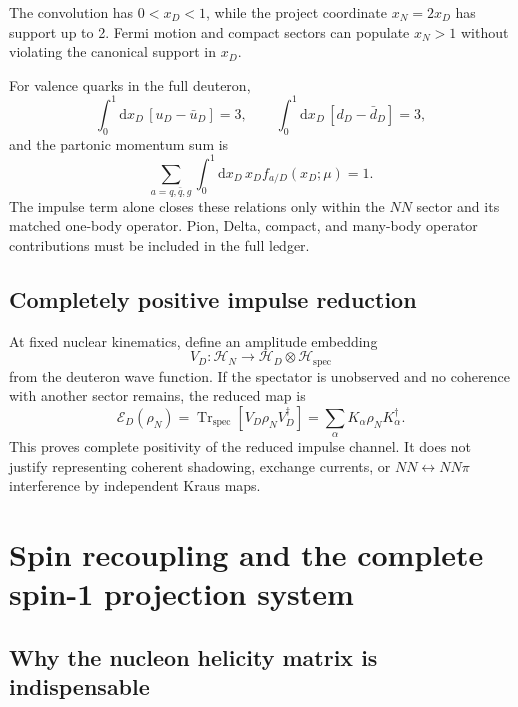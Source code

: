 \documentclass[11pt]{article}
\newcommand{\dd}{\mathrm{d}}
\newcommand{\Tr}{\operatorname{Tr}}
\newcommand{\Hil}{\mathcal H}
\newcommand{\cE}{\mathcal E}
\newcommand{\spec}{\mathrm{spec}}
\begin{document}
The convolution has \(0<x_D<1\), while the project coordinate
\(x_N=2x_D\) has support up to 2.  Fermi motion and compact sectors can
populate \(x_N>1\) without violating the canonical support in \(x_D\).

For valence quarks in the full deuteron,
\begin{equation}
 \int_0^1\dd x_D\,[u_D-\bar u_D]=3,
 \qquad
 \int_0^1\dd x_D\,[d_D-\bar d_D]=3,
\label{eq:deuteron-valence-ledger}
\end{equation}
and the partonic momentum sum is
\begin{equation}
 \sum_{a=q,\bar q,g}
 \int_0^1\dd x_D\,x_D f_{a/D}(x_D;\mu)=1.
\label{eq:deuteron-parton-momentum-sum}
\end{equation}
The impulse term alone closes these relations only within the \(NN\) sector
and its matched one-body operator.  Pion, Delta, compact, and many-body
operator contributions must be included in the full ledger.

\subsection{Completely positive impulse reduction}

At fixed nuclear kinematics, define an amplitude embedding
\begin{equation}
 V_D:\Hil_N\longrightarrow\Hil_D\otimes\Hil_{\spec}
\label{eq:nuclear-amplitude-embedding}
\end{equation}
from the deuteron wave function.  If the spectator is unobserved and no
coherence with another sector remains, the reduced map is
\begin{equation}
 \cE_D(\rho_N)
 =\Tr_{\spec}\left[V_D\rho_NV_D^\dagger\right]
 =\sum_\alpha K_\alpha\rho_NK_\alpha^\dagger.
\label{eq:impulse-cp-map}
\end{equation}
This proves complete positivity of the reduced impulse channel.  It does not
justify representing coherent shadowing, exchange currents, or
\(NN\leftrightarrow NN\pi\) interference by independent Kraus maps.

\section{Spin recoupling and the complete spin-1 projection system}
\label{sec:spin-recoupling}

\subsection{Why the nucleon helicity matrix is indispensable}
\end{document}
